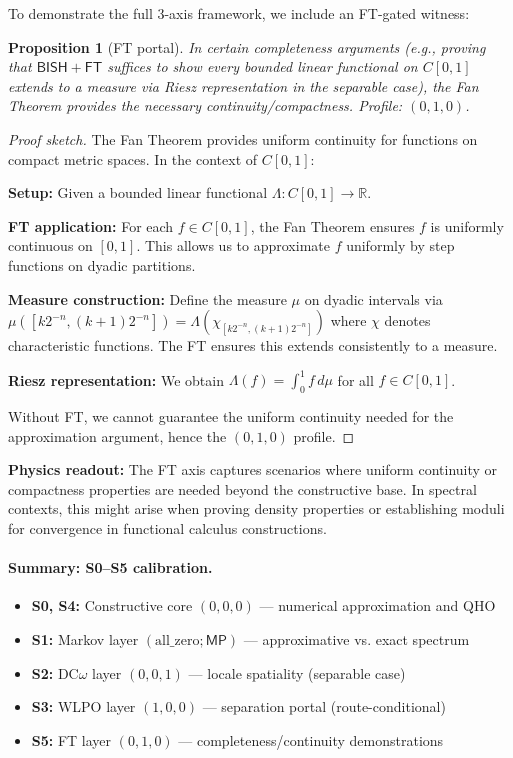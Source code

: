 \documentclass[11pt]{article}
\newcommand{\FT}{\mathsf{FT}}
\newcommand{\MP}{\mathsf{MP}}
\newcommand{\leanok}{\text{\tiny [✓ Lean]}}
\theoremstyle{plain}
\newtheorem{proposition}[theorem]{Proposition}
\theoremstyle{definition}
\theoremstyle{remark}
\newcommand{\R}{\mathbb{R}}
\newcommand{\BISH}{\mathsf{BISH}}
\begin{document}
To demonstrate the full 3-axis framework, we include an FT-gated witness:

\begin{proposition}[FT portal] \leanok
In certain completeness arguments (e.g., proving that $\BISH + \FT$ suffices to show every bounded linear functional on $C[0,1]$ extends to a measure via Riesz representation in the separable case), the Fan Theorem provides the necessary continuity/compactness. Profile: $(0,1,0)$.
\end{proposition}

\begin{proof}[Proof sketch]
The Fan Theorem provides uniform continuity for functions on compact metric spaces. In the context of $C[0,1]$:

\textbf{Setup:} Given a bounded linear functional $\Lambda: C[0,1] \to \R$.

\textbf{FT application:} For each $f \in C[0,1]$, the Fan Theorem ensures $f$ is uniformly continuous on $[0,1]$. 
This allows us to approximate $f$ uniformly by step functions on dyadic partitions.

\textbf{Measure construction:} Define the measure $\mu$ on dyadic intervals via $\mu([k2^{-n}, (k+1)2^{-n}]) = \Lambda(\chi_{[k2^{-n}, (k+1)2^{-n}]})$ where $\chi$ denotes characteristic functions. The FT ensures this extends consistently to a measure.

\textbf{Riesz representation:} We obtain $\Lambda(f) = \int_0^1 f \, d\mu$ for all $f \in C[0,1]$.

Without FT, we cannot guarantee the uniform continuity needed for the approximation argument, hence the $(0,1,0)$ profile.
\end{proof}

\noindent\textbf{Physics readout:} The FT axis captures scenarios where uniform continuity or compactness properties are needed beyond the constructive base. In spectral contexts, this might arise when proving density properties or establishing moduli for convergence in functional calculus constructions.

\paragraph{Summary: S0--S5 calibration.} 
\begin{itemize}
\item \textbf{S0, S4:} Constructive core $(0,0,0)$ — numerical approximation and QHO 
\item \textbf{S1:} Markov layer $(\text{all\_zero}; \MP)$ — approximative vs. exact spectrum
\item \textbf{S2:} DC$\omega$ layer $(0,0,1)$ — locale spatiality (separable case) 
\item \textbf{S3:} WLPO layer $(1,0,0)$ — separation portal (route-conditional)
\item \textbf{S5:} FT layer $(0,1,0)$ — completeness/continuity demonstrations
\end{itemize}
\end{document}
